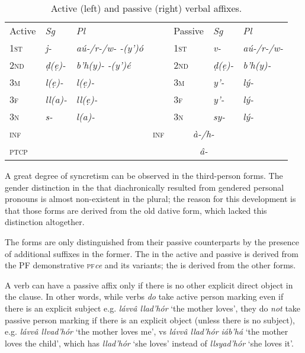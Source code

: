 \documentclass[a4paper, 12pt, twoside, final]{article}
\def\pfabbr{{\normalfont\scshape pf\space}}
\def\pf#1{\pfabbr\textit{#1}}
\let \nf \normalfont
\let \w \textit
\begin{document}
\begin{table}[H]
\centering
\noindent\begin{tabular}{l|>{\it}l|>{\it}lll|>{\it}l|>{\it}l}
Active&\nf Sg&\nf Pl& & Passive&\nf Sg&\nf Pl\\\cline{1-3}\cline{5-7}
\scshape 1st&j-&aú-/r-/w- -(y’)ó  &&\scshape 1st&v-&aú-/r-/w-\\
\scshape 2nd&ḍ(ẹ)-&b’h(y)- -(y’)é &&\scshape 2nd&ḍ(ẹ)-&b’h(y)-\\
\scshape 3m&l(ẹ)-&l(ẹ)-           &&\scshape 3m&y’-&lý-\\
\scshape 3f&ll(a)-&ll(ẹ)-         &&\scshape 3f&y’- &lý-\\
\scshape 3n&s- &l(a)-             &&\scshape 3n&sy-&lý-\\\cline{1-3}\cline{5-7}
\scshape inf&\multicolumn{2}{c}{\it d(ẹ)-}&&\scshape inf&\multicolumn{2}{c}{\it à-/h-}\\
\scshape ptcp&\multicolumn{2}{c}{\it -â}&&\s{ptcp}&\multicolumn{2}{c}{\it â-}\\
\end{tabular}
\caption{Active (left) and passive (right) verbal affixes.}\label{tab:active-passive-prefixes}
\end{table}

\noindent A great degree of syncretism can be observed in the third-person forms. The gender distinction in the
 that diachronically resulted from gendered personal pronouns is almost non-existent in the
plural; the reason for this development is that those forms are derived from the old dative form, which lacked
this distinction altogether.

The  forms are only distinguished from their passive counterparts by
the presence of additional suffixes in the former. The  in the active and passive is derived from the PF
demonstrative \pf{ce} and its variants; the  is derived from the other  forms.

A verb can have a passive affix only if there is no other explicit direct object in the clause. In other words, while verbs
\textit{do} take active person marking even if there is an explicit subject e.g. \w{lávvâ llad’hór} ‘the mother loves’, they do
\w{not} take passive person marking if there is an explicit object (unless there is no subject), e.g. \w{lávvâ llvad’hór} ‘the
mother loves me’, vs \w{lávvâ llad’hór iáb’há} ‘the mother loves the child’, which has \w{llad’hór} ‘she loves’ instead of
\w{llsyad’hór} ‘she loves it’.
\end{document}
